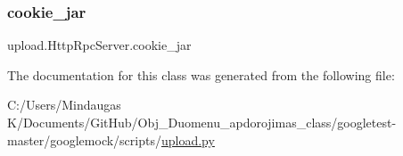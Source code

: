 \mbox{\label{classupload_1_1_http_rpc_server_a1b9c9af7f0a46afd84a9d524782323bf}} 
\subsubsection{\texorpdfstring{cookie\_jar}{cookie\_jar}}
{\footnotesize\ttfamily upload.\+Http\+Rpc\+Server.\+cookie\+\_\+jar}



The documentation for this class was generated from the following file\+:\begin{DoxyCompactItemize}
\item 
C\+:/\+Users/\+Mindaugas K/\+Documents/\+Git\+Hub/\+Obj\+\_\+\+Duomenu\+\_\+apdorojimas\+\_\+class/googletest-\/master/googlemock/scripts/\mbox{\hyperlink{googletest-master_2googlemock_2scripts_2upload_8py}{upload.\+py}}\end{DoxyCompactItemize}
